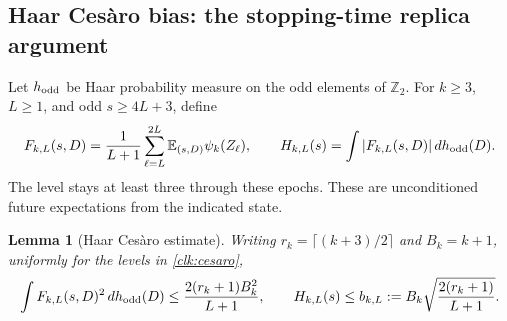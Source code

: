 \documentclass[11pt]{amsart}
\newtheorem{lemma}[theorem]{Lemma}
\theoremstyle{definition}
\theoremstyle{remark}
\newcommand{\E}{\mathbb E}
\newcommand{\Ztwo}{\mathbb Z_2}
\begin{document}
\subsection{Haar Ces\`aro bias: the stopping-time replica argument}

Let $h_{\rm odd}$ be Haar probability measure on the odd elements of
$\Ztwo$. For $k\ge3$, $L\ge1$, and odd $s\ge4L+3$, define
\begin{equation}\label{clk:cesaro}
 F_{k,L}(s,D)=\frac1{L+1}\sum_{\ell=L}^{2L}
                 \E_{(s,D)}\psi_k(Z_\ell),\qquad
 H_{k,L}(s)=\int|F_{k,L}(s,D)|\,dh_{\rm odd}(D).
\end{equation}
The level stays at least three through these epochs. These are
unconditioned future expectations from the indicated state.

\begin{lemma}[Haar Ces\`aro estimate]\label{clk:haar-bias}
Writing $r_k=\lceil(k+3)/2\rceil$ and $B_k=k+1$, uniformly for the
levels in \eqref{clk:cesaro},
\begin{equation}\label{clk:haar-bound}
 \int F_{k,L}(s,D)^2\,dh_{\rm odd}(D)
      \le\frac{2(r_k+1)B_k^2}{L+1},\qquad
 H_{k,L}(s)\le b_{k,L}:=B_k\sqrt{\frac{2(r_k+1)}{L+1}}.
\end{equation}
\end{lemma}
\end{document}

